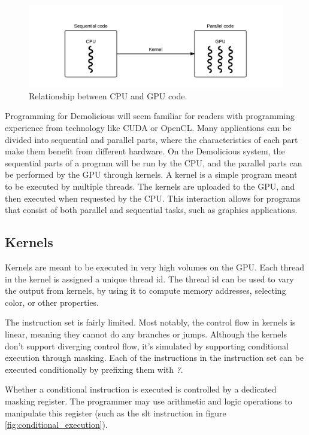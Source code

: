\begin{figure}[H]
	\centering
	\includegraphics[width=\textwidth]{../system_overview/diagrams/programming_model_cpu_gpu.png}
	\caption{Relationship between CPU and GPU code.}
	\label{fig:programming_model_cpu_gpu}
\end{figure}

Programming for Demolicious will seem familiar for readers with programming experience from technology like CUDA or OpenCL. 
Many applications can be divided into sequential and parallel parts,
where the characteristics of each part make them benefit from different hardware.
On the Demolicious system, the sequential parts of a program will be run by the CPU, and the parallel parts can be performed by the GPU through kernels.
A kernel is a simple program meant to be executed by multiple threads.
The kernels are uploaded to the GPU, and then executed when requested by the CPU.
This interaction allows for programs that consist of both parallel and sequential tasks, such as graphics applications.

\subsection{Kernels}
Kernels are meant to be executed in very high volumes on the GPU.
Each thread in the kernel is assigned a unique thread id.
The thread id can be used to vary the output from kernels, 
by using it to compute memory addresses, selecting color, or other properties.

The instruction set is fairly limited.
Most notably, the control flow in kernels is linear, meaning they cannot do any branches or jumps.
Although the kernels don't support diverging control flow,
it's simulated by supporting conditional execution through masking.
Each of the instructions in the instruction set can be executed conditionally by prefixing them with \textit{?}.

Whether a conditional instruction is executed is controlled by a dedicated masking register.
The programmer may use arithmetic and logic operations to manipulate this register (such as the slt instruction in figure \ref{fig:conditional_execution}).


